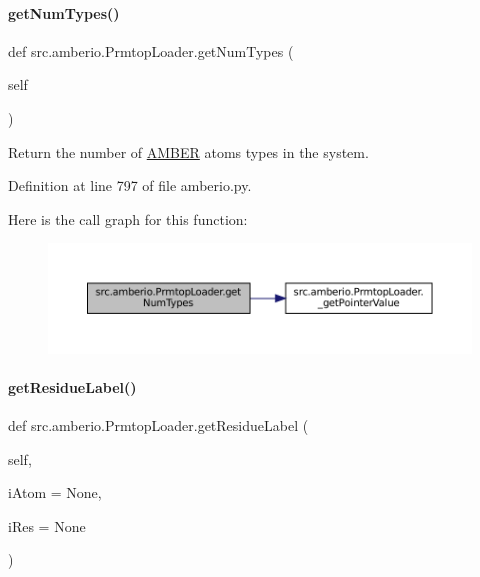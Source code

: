 \paragraph{\texorpdfstring{get\+Num\+Types()}{getNumTypes()}}
{\footnotesize\ttfamily def src.\+amberio.\+Prmtop\+Loader.\+get\+Num\+Types (\begin{DoxyParamCaption}\item[{}]{self }\end{DoxyParamCaption})}



Return the number of \hyperlink{classsrc_1_1amberio_1_1AMBER}{A\+M\+B\+ER} atoms types in the system. 



Definition at line 797 of file amberio.\+py.

Here is the call graph for this function\+:
\nopagebreak
\begin{figure}[H]
\begin{center}
\leavevmode
\includegraphics[width=350pt]{classsrc_1_1amberio_1_1PrmtopLoader_ab5fd1aa3c74924b90c4582cc7e15a7ab_cgraph}
\end{center}
\end{figure}
\mbox{\label{classsrc_1_1amberio_1_1PrmtopLoader_a75f9c306f8321358b533f67d5354f1b1}} 
\paragraph{\texorpdfstring{get\+Residue\+Label()}{getResidueLabel()}}
{\footnotesize\ttfamily def src.\+amberio.\+Prmtop\+Loader.\+get\+Residue\+Label (\begin{DoxyParamCaption}\item[{}]{self,  }\item[{}]{i\+Atom = {\ttfamily None},  }\item[{}]{i\+Res = {\ttfamily None} }\end{DoxyParamCaption})}



